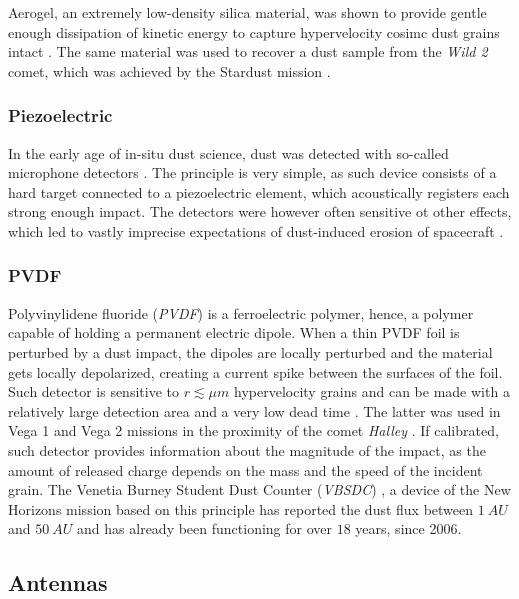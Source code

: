 Aerogel, an extremely low-density silica material, was shown to provide gentle enough dissipation of kinetic energy to capture hypervelocity cosimc dust grains intact \citep{tsou1995silica}. The same material was used to recover a dust sample from the \textit{Wild 2} comet, which was achieved by the Stardust mission \citep{brownlee2014stardust}. 

\subsubsection{Piezoelectric}

In the early age of in-situ dust science, dust was detected with so-called microphone detectors \citep{alexander1963review}. The principle is very simple, as such device consists of a hard target connected to a piezoelectric element, which acoustically registers each strong enough impact. The detectors were however often sensitive ot other effects, which led to vastly imprecise expectations of dust-induced erosion of spacecraft \citep{whipple1958meteoritic}. 

\subsubsection{PVDF} 

Polyvinylidene fluoride (\textit{PVDF}) is a ferroelectric polymer, hence, a polymer capable of holding a permanent electric dipole. When a thin PVDF foil is perturbed by a dust impact, the dipoles are locally perturbed and the material gets locally depolarized, creating a current spike between the surfaces of the foil. Such detector is sensitive to $r \lesssim \si{\mu m}$ hypervelocity grains and can be made with a relatively large detection area and a very low dead time \citep{tuzzolino1996applications}. The latter was used in Vega 1 and Vega 2 missions in the proximity of the comet \textit{Halley} \citep{simpson1988dust}. If calibrated, such detector provides information about the magnitude of the impact, as the amount of released charge depends on the mass and the speed of the incident grain. The Venetia Burney Student Dust Counter (\textit{VBSDC}) \citep{james2010pvdf}, a device of the New Horizons mission based on this principle has reported the dust flux between $\SI{1}{AU}$ and $\SI{50}{AU}$ \citep{bernardoni2022student} and has already been functioning for over $18$ years, since 2006. 

\subsection{Antennas}

